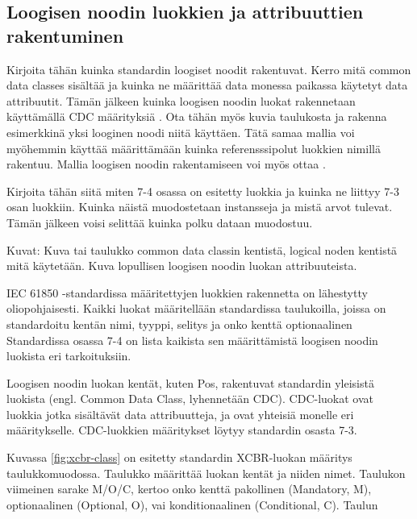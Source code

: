 \subsection{Loogisen noodin luokkien ja attribuuttien rakentuminen}
\begin{it}
	Kirjoita tähän kuinka standardin loogiset noodit rakentuvat. Kerro mitä common data classes sisältää ja kuinka ne määrittää data monessa paikassa käytetyt data attribuutit. Tämän jälkeen kuinka loogisen noodin luokat rakennetaan käyttämällä CDC määrityksiä \cite[s.~26]{IEC61850-1}. Ota tähän myös kuvia taulukosta ja rakenna esimerkkinä yksi looginen noodi niitä käyttäen. Tätä samaa mallia voi myöhemmin käyttää määrittämään kuinka referensssipolut luokkien nimillä rakentuu.
	Mallia loogisen noodin rakentamiseen voi myös ottaa \cite[s.~27]{IEC61850-7-1}.

	Kirjoita tähän siitä miten 7-4 osassa on esitetty luokkia ja kuinka ne liittyy 7-3 osan luokkiin. Kuinka näistä muodostetaan instansseja ja mistä arvot tulevat. Tämän jälkeen voisi selittää kuinka polku dataan muodostuu.

	Kuvat:
	Kuva tai taulukko common data classin kentistä, logical noden kentistä mitä käytetään.
	Kuva lopullisen loogisen noodin luokan attribuuteista.
\end{it}

IEC 61850 -standardissa määritettyjen luokkien rakennetta on lähestytty oliopohjaisesti. Kaikki luokat määritellään standardissa taulukoilla, joissa on standardoitu kentän nimi, tyyppi, selitys ja onko kenttä optionaalinen Standardissa osassa 7-4 on lista kaikista sen määrittämistä loogisen noodin luokista eri tarkoituksiin. 

Loogisen noodin luokan kentät, kuten Pos, rakentuvat standardin yleisistä luokista (engl. Common Data Class, lyhennetään CDC). CDC-luokat ovat luokkia jotka sisältävät data attribuutteja, ja ovat yhteisiä monelle eri määritykselle. CDC-luokkien määritykset löytyy standardin osasta 7-3.

Kuvassa \ref{fig:xcbr-class} on esitetty standardin XCBR-luokan määritys taulukkomuodossa. Taulukko määrittää luokan kentät ja niiden nimet. Taulukon viimeinen sarake M/O/C, kertoo onko kenttä pakollinen (Mandatory, M), optionaalinen (Optional, O), vai konditionaalinen (Conditional, C). Taulun

